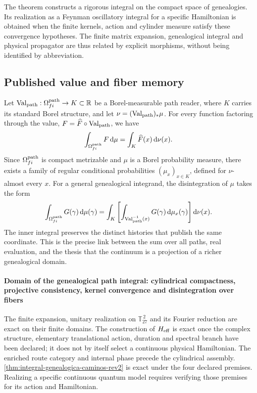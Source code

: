 The theorem constructs a rigorous integral on the compact space of
genealogies. Its realization as a Feynman oscillatory integral for a
specific Hamiltonian is obtained when the finite kernels, action and
cylinder measure satisfy these convergence hypotheses. The finite
matrix expansion, genealogical integral and physical propagator are thus
related by explicit morphisms, without being identified by abbreviation.

\subsection{Published value and fiber memory}

Let
\(\operatorname{Val}_{\rm path}:\Omega^{\rm path}_{fi}\to K\subset\mathbb R\)
be a Borel-measurable path reader, where \(K\) carries its standard
Borel structure, and let
\(\nu=(\operatorname{Val}_{\rm path})_*\mu\). For every function
factoring through the value, \(F=\widehat F\circ\operatorname{Val}_{\rm path}\),
we have
\[
 \int_{\Omega^{\rm path}_{fi}}F\,\mathrm d\mu
 =\int_K\widehat F(x)\,\mathrm d\nu(x).
\]
Since \(\Omega^{\rm path}_{fi}\) is compact metrizable and \(\mu\) is a Borel
probability measure, there exists a family of regular conditional
probabilities \((\mu_x)_{x\in K}\), defined for \(\nu\)-almost every
\(x\). For a general genealogical integrand, the disintegration of
\(\mu\) takes the form
\begin{equation}
 \int_{\Omega^{\rm path}_{fi}}G(\gamma)\,\mathrm d\mu(\gamma)
 =\int_K\left[
   \int_{\operatorname{Val}_{\rm path}^{-1}(x)}
   G(\gamma)\,\mathrm d\mu_x(\gamma)
  \right]\mathrm d\nu(x).
 \label{eq:desintegracion-genealogica-caminos-rev2}
\end{equation}
The inner integral preserves the distinct histories that publish the same
coordinate. This is the precise link between the sum over all paths,
real evaluation, and the thesis that the continuum is a projection of
a richer genealogical domain.

\paragraph{Domain of the genealogical path integral: cylindrical compactness, projective consistency, kernel convergence and disintegration over fibers}
The finite expansion, unitary realization on
\(\mathbb T_{27}^{\,2}\) and its Fourier reduction are exact on their finite
domains. The construction of \(H_{\rm eff}\) is
exact once the complex structure, elementary translational
action, duration and spectral branch have been declared; it does not by itself select a
continuous physical Hamiltonian. The enriched route category and internal
phase precede the cylindrical assembly.
\cref{thm:integral-genealogica-caminos-rev2} is exact under the four
declared premises. Realizing a specific continuous quantum model
requires verifying those premises for its action and Hamiltonian.
